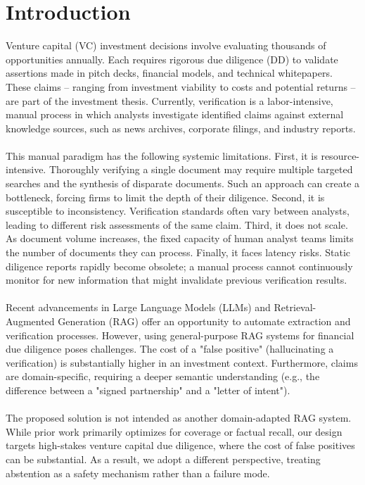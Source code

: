 \section{Introduction}

Venture capital (VC) investment decisions involve evaluating thousands of opportunities annually. Each requires rigorous due diligence (DD) to validate assertions made in pitch decks, financial models, and technical whitepapers. These claims -- ranging from investment viability to costs and potential returns -- are part of the investment thesis. Currently, verification is a labor-intensive, manual process in which analysts investigate identified claims against external knowledge sources, such as news archives, corporate filings, and industry reports.
\\
\\
This manual paradigm has the following systemic limitations. 
First, it is resource-intensive. Thoroughly verifying a single document may require multiple targeted searches and the synthesis of disparate documents. Such an approach can create a bottleneck, forcing firms to limit the depth of their diligence. 
Second, it is susceptible to inconsistency. Verification standards often vary between analysts, leading to different risk assessments of the same claim. 
Third, it does not scale. As document volume increases, the fixed capacity of human analyst teams limits the number of documents they can process.
Finally, it faces latency risks. Static diligence reports rapidly become obsolete; a manual process cannot continuously monitor for new information that might invalidate previous verification results.
\\
\\
Recent advancements in Large Language Models (LLMs) and Retrieval-Augmented Generation (RAG) offer an opportunity to automate extraction and verification processes. However, using general-purpose RAG systems for financial due diligence poses challenges. The cost of a "false positive" (hallucinating a verification) is substantially higher in an investment context. Furthermore, claims are domain-specific, requiring a deeper semantic understanding (e.g., the difference between a "signed partnership" and a "letter of intent").
\\
\\
The proposed solution is not intended as another domain-adapted RAG system. While prior work primarily optimizes for coverage or factual recall, our design targets high-stakes venture capital due diligence, where the cost of false positives can be substantial. As a result, we adopt a different perspective, treating abstention as a safety mechanism rather than a failure mode.
